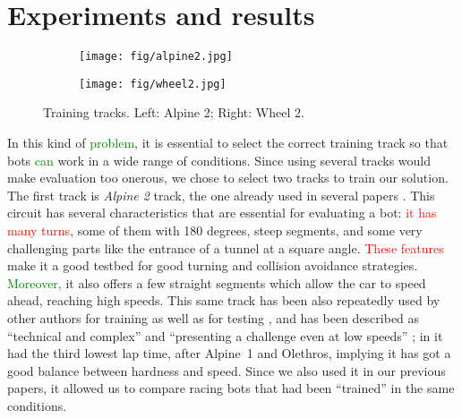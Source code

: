 \documentclass[10pt,journal,compsoc]{IEEEtran}
\begin{document}
\section{Experiments and results}  
\label{sec:results}

%
\begin{figure}[!ht]	
\centering
\begin{subfigure}[b]{0.15\textwidth}
	\centering
	\texttt{[image: fig/alpine2.jpg]}
	\label{fig:alpine2}
\end{subfigure}
\hfill
\begin{subfigure}[b]{0.15\textwidth}
	\centering
	\texttt{[image: fig/wheel2.jpg]}
	\label{fig:wheel2}
\end{subfigure}
\caption{Training tracks. Left: Alpine 2; Right: Wheel 2.}
\label{fig:alpine2_wheel2track}
\end{figure}

In this kind of \textcolor{green}{problem}, it is essential to select the correct
training track so that bots \textcolor{green}{can} work in a wide range of
conditions. Since using several tracks would make evaluation too onerous, we chose to select two tracks to train our solution. The first track is \textit{Alpine 2} track, the one already used in several papers  \cite{salem_cig2018,DBLP:conf/cig/SalemMG19}. This circuit has several characteristics that
are essential for evaluating a bot: \textcolor{red}{it has many turns}, some of
them with 180 degrees, steep segments, and some very challenging parts
like the entrance of a tunnel at a square angle. \textcolor{red}{ These features} make
it a good testbed for good turning and collision avoidance
strategies. \textcolor{green}{Moreover,} it also offers a few straight segments which allow the car to speed ahead, reaching high speeds. This same track has been also repeatedly used by other authors for training as well as for testing \cite{cardamone2010applying}, and has been described as ``technical and complex'' \cite{AG} and ``presenting a challenge even at low speeds'' \cite{vrajitoru2018global}; in \cite{AG} it had the third lowest lap time, after \mbox{Alpine 1} and Olethros, implying it has got a good balance between hardness and speed. Since we also used it in our previous papers, it allowed us to compare racing bots that had been ``trained'' in the same conditions.
\end{document}

